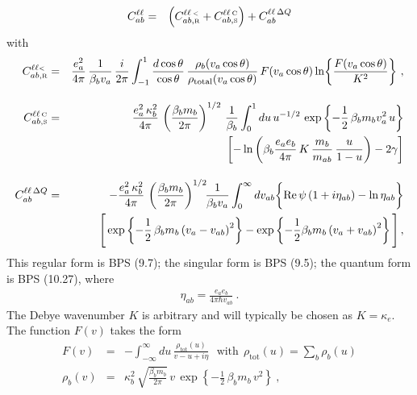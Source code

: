 \documentclass[preprint,12pt,eqsecnum,nofootinbib,amsmath,amssymb]{revtex4}
\newcommand{\smC}{{\rm\scriptscriptstyle C}}
\newcommand{\smR}{{\rm\scriptscriptstyle R}}
\newcommand{\smS}{{\rm\scriptscriptstyle S}}
\newcommand{\smLT}{{\rm\scriptscriptstyle <}}
\begin{document}
\begin{eqnarray}
  C_{ab}^{\ell\ell} 
  &=&  
  \Big(C^{\ell\ell\,\smLT}_{ab,\smR}  
  + 
  C^{\ell\ell\,\smC}_{ab,\smS} \Big) 
  +
  C^{\ell\ell \, \Delta Q}_{ab} 
\label{all}
\end{eqnarray}
with 
\begin{eqnarray}
  C^{\ell\ell\smLT}_{ab,\smR}
  &=&
  \frac{e_a^2}{4 \pi}\, \frac{1}{\beta_b v_a}\,
  \frac{i}{2 \pi}
  \int_{-1}^1   \frac{d\cos\theta}{\cos\theta} \,
  \frac{\rho_b(v_a\cos\theta)}
  {\rho_{\rm total}(v_a\cos\theta)}\,F(v_a \cos\theta) 
  \ln\!\left\{\frac{F(v_a\cos\theta)}{K^2}\right\} \,, 
\label{nun}
\\[10pt]
  C^{\ell\ell \, \smC}_{ab,\smS}
  &=& 
  \frac{e_a^2\,\kappa^2_b}{4\pi} \,   
  \left( \frac{\beta_b m_b}{2\pi} \right)^{1/2} \, \frac{1}{\beta_b}
  \int_0^1 du \, u^{-1/2} \,\exp\left\{ - \frac{1}{2} \,
  \beta_b m_b v^2_a \, u \right\}
\nonumber\\
  && \qquad
  \left[ -\ln \left(\beta_b  \frac{e_a e_b}{4\pi} \,
  K \, \frac{m_b}{m_{ab}} \, \frac{u}{1-u} \right) 
  - 2 \gamma \right] 
\label{wonderclassic}
\\[10pt]
  C^{\ell\ell \, \Delta Q}_{ab}
  &=&
  -\frac{e_a^2\, \kappa_b^2}{4 \pi}\,
  \left( \frac{\beta_b m_b}{2\pi} \right)^{1/2} \! \!
   \frac{1}{\beta_b v_a}
  \int_0^\infty dv_{ab}
  \bigg\{ {\rm Re} \, \psi \left( 1 + i \eta_{ab}
  \right) - \ln \eta_{ab}  \bigg\}
\nonumber\\
  &&
  \Bigg[ \exp\left\{ - \frac{1}{2}\, \beta_b
  m_b \left( v_a - v_{ab} \right)^2\right\} 
  - \exp\left\{ - \frac{1}{2} \beta_b m_b \left( v_a + v_{ab} 
  \right)^2\right\} 
\Bigg]	\,,
\label{regb}
\end{eqnarray}
This regular form is  BPS (9.7); the singular form is BPS (9.5);
the quantum form is BPS (10.27), where
\begin{eqnarray}
\eta_{ab}= \frac{e_a e_b}{4\pi\hbar v_{ab}} \ .
\end{eqnarray}
The Debye wavenumber $K$ is arbitrary and will typically be chosen as
$K=\kappa_e$. The function $F(v)$ takes the form
\begin{eqnarray}
  F(v) 
  &=& 
  -\int_{-\infty}^\infty \! du \, 
  \frac{\rho_\text{tot}(u)}{v - u + i\eta} 
  ~~~\text{with}~~
  \rho_\text{tot}(u)=\sum_b\rho_b(u)
\label{Fdef}
\\[5pt]
  \rho_b(v) 
  &=& 
  \kappa_b^2\,\sqrt{\frac{\beta_b m_b}{2\pi}}\, v\,
  \exp\!\left\{-\frac{1}{2}\,\beta_b m_b\, v^2\right\} \ ,
\label{rhototdef}
\end{eqnarray}
\end{document}
